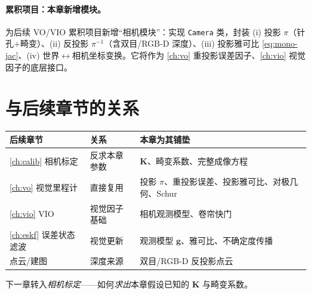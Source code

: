 \paragraph{累积项目：本章新增模块。}
为后续 VO/VIO 累积项目新增“相机模块”：实现 \texttt{Camera} 类，封装 (i) 投影 $\pi$（针孔$+$畸变）、(ii) 反投影 $\pi^{-1}$（含双目/RGB-D 深度）、(iii) 投影雅可比 \cref{eq:mono-jac}、(iv) 世界$\leftrightarrow$相机坐标变换。它将作为 \cref{ch:vo} 重投影误差因子、\cref{ch:vio} 视觉因子的底层接口。

\section*{与后续章节的关系}
\begin{table}[H]\centering\small
\begin{tabular}{lll}
\toprule
后续章节 & 关系 & 本章为其铺垫 \\
\midrule
\cref{ch:calib} 相机标定 & 反求本章参数 & $\mathbf{K}$、畸变系数、完整成像方程 \\
\cref{ch:vo} 视觉里程计 & 直接复用 & 投影 $\pi$、重投影误差、投影雅可比、对极几何、Schur \\
\cref{ch:vio} VIO & 视觉因子基础 & 相机观测模型、卷帘快门 \\
\cref{ch:eskf} 误差状态滤波 & 视觉更新 & 观测模型 $\mathbf{g}$、雅可比、不确定度传播 \\
点云/建图 & 深度来源 & 双目/RGB-D 反投影点云 \\
\bottomrule
\end{tabular}
\end{table}
\noindent 下一章转入\emph{相机标定}——如何\emph{求出}本章假设已知的 $\mathbf{K}$ 与畸变系数。

